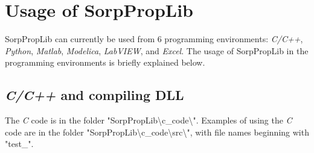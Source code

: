\chapter{Usage of SorpPropLib}
\label{cha:usage}
%
SorpPropLib can currently be used from 6 programming environments: \textit{C/C++}, \textit{Python}, \textit{Matlab}, \textit{Modelica}, \textit{LabVIEW}, and \textit{Excel}. The usage of SorpPropLib in the programming environments is briefly explained below.
\section{\textit{C/C++} and compiling DLL}
\label{cha:usage:c}
%
The \textit{C} code is in the folder "SorpPropLib\textbackslash c\_code\textbackslash". Examples of using the \textit{C} code are in the folder "SorpPropLib\textbackslash c\_code\textbackslash src\textbackslash", with file names beginning with "test\_".

